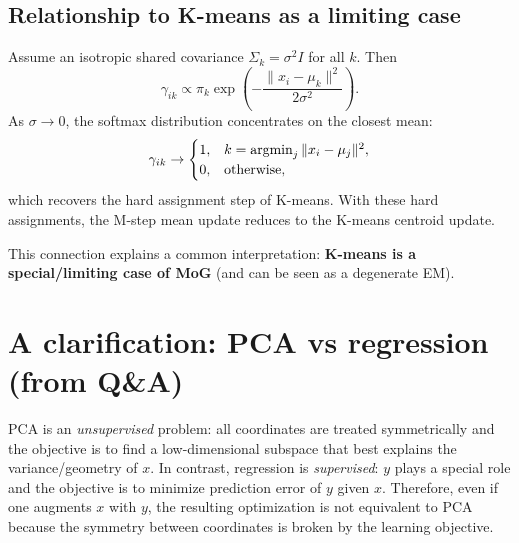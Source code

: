 \documentclass[../main]{subfiles}
\begin{document}
\subsection{Relationship to K-means as a limiting case}
Assume an isotropic shared covariance $\Sigma_k=\sigma^2 I$ for all $k$.
Then
\begin{equation}
    \gamma_{ik}
    \propto
    \pi_k \exp\!\left(-\frac{\|x_i-\mu_k\|^2}{2\sigma^2}\right).
\end{equation}
As $\sigma\to 0$, the softmax distribution concentrates on the closest mean:
\begin{equation}
    \gamma_{ik}
    \to
    \begin{cases}
        1, & k=\mathop{\mathrm{argmin}}_j \|x_i-\mu_j\|^2,\\
        0, & \text{otherwise},
    \end{cases}
\end{equation}
which recovers the hard assignment step of K-means. With these hard assignments,
the M-step mean update reduces to the K-means centroid update.

\begin{remark}
    This connection explains a common interpretation: \textbf{K-means is a
    special/limiting case of MoG} (and can be seen as a degenerate EM).
\end{remark}

\section{A clarification: PCA vs regression (from Q\&A)}
\begin{note}
    PCA is an \emph{unsupervised} problem: all coordinates are treated
    symmetrically and the objective is to find a low-dimensional subspace that
    best explains the variance/geometry of $x$.
    In contrast, regression is \emph{supervised}: $y$ plays a special role and
    the objective is to minimize prediction error of $y$ given $x$.
    Therefore, even if one augments $x$ with $y$, the resulting optimization is
    not equivalent to PCA because the symmetry between coordinates is broken by
    the learning objective.
\end{note}
\end{document}

